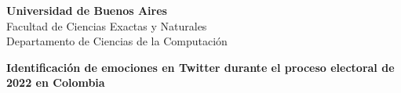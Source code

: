 \begin{titlepage}
\enlargethispage{3cm}

\begin{center}

\vspace*{-1cm}


\begin{figure}[h]
	\begin{center}
	\end{center}
\end{figure}

\vspace*{1cm}

{\bf\large Universidad de Buenos Aires} \\[10pt]
{\large Facultad de Ciencias Exactas y Naturales}\\%
{\large Departamento de Ciencias de la Computación}\\%


\vspace*{1cm}

\textbf{\Large Identificación de emociones en Twitter durante el proceso electoral
	de 2022 en Colombia
}\\[10pt]


\end{center}
\end{titlepage}
